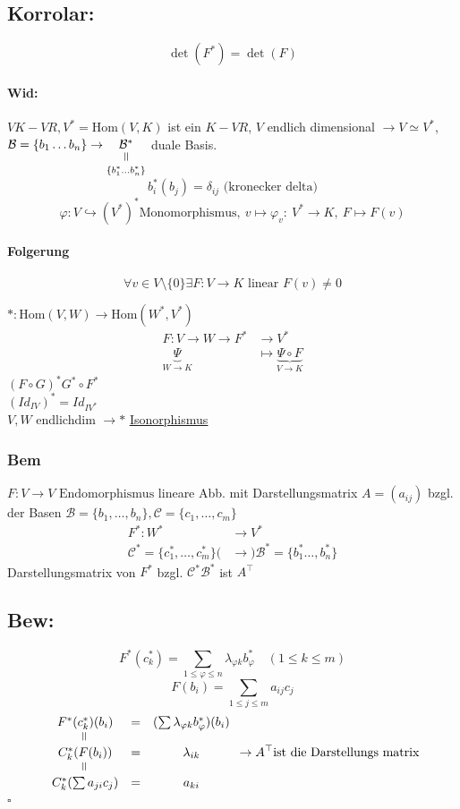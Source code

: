 \documentclass[titlepage,12pt,a4paper,ngerman]{report}
\newenvironment{bew}[1]{\subsection{Bew: #1}}{\hfill$\square$}
\newcommand{\Bew}[2]{\begin{bew}{#1}#2\end{bew}}
\newcommand{\verteq}{\rotatebox{90}{$\,=$}}
\newcommand{\equalto}[2]{\underset{\scriptstyle\overset{\mkern4mu\verteq}{#2}}{#1}}
\newcommand{\tx}[1]{\textrm{#1}}
\newcommand{\ub}[1]{\underbrace{#1}}
\newcommand{\enph}{F: V \to V \textrm{ Endomorphismus}}
\begin{document}
\subsection{Korrolar:}
$$ \det(F^*) = \det(F) $$


\paragraph{Wid:}
$V K-VR, V^* = \tx{Hom} (V,K)$ ist ein $K-VR$, $V$ endlich dimensional $\rightarrow V \simeq V^*$, $\mathcal B = \{b_1 \dots b_n\} \rightarrow \equalto{\mathcal{B}^*}{\{b_1^* \dots b_n^*\}}$ duale Basis.
$$b_i^* (b_j) = \delta_{ij} \tx{ (kronecker delta)}$$
$$\varphi: V \hookrightarrow (V^*)^* \tx{Monomorphismus},\ v \mapsto \varphi_v:\ V^* \to K,\ F \mapsto F(v)$$ 
\paragraph{Folgerung}
$$\forall v \in V \setminus \{0\} \exists F: V \to K \tx{ linear } F(v) \neq 0$$

$ * : \tx{Hom}(V,W) \to \tx{Hom}(W^*,V^*) $\\
\begin{align*}
F: V \to W \rightarrow F^* &\to V^* \\
\ub{\Psi}_{W \to K} &\mapsto \ub{ \Psi \circ F}_{ V \to K} 
\end{align*}
$ (F\circ G)^* G^* \circ F^* $\\
$ (Id_{IV})^* = Id_{IV^*} $\\
$ V,W $ endlichdim $ \rightarrow * $ \underline{\underline{Isonorphismus}} 

\subsubsection*{Bem}
$ \enph $ lineare Abb. mit Darstellungsmatrix $ A = (a_{ij}) $ bzgl. der Basen $ \mathcal{B} = \{b_1,\dots ,b_n\} , \mathcal{C}= \{c_1,\dots,c_m\} $\\

\begin{align*}
F^*: W^* &\to V^* \\
\mathcal{C}^* = \{ c^*_1,\dots , c^*_m\} (&\rightarrow) \mathcal{B}^* = \{b^*_1  \dots , b^*_n\} 
\end{align*} 
Darstellungsmatrix von $ F^* $ bzgl. $ \mathcal{C}^* \mathcal{B}^* $ ist $ A^\top $

\Bew{}{
	$$F^* (c_k^*) = \sum _{1\leq \varphi \leq n} \lambda_{\varphi k}b_\varphi^* \quad (1\leq k \leq m)$$
	$$F(b_i) = \sum _{1\leq j \leq m} a_{ij} c_j$$
	$$ \begin{array}{ccc}
	F^* (c_k^*) (b_i) & = &(\sum \lambda_{\varphi k} b_\varphi^*) (b_i)\\
	\rotatebox{90}{=} & &  \\
	C_k^* (F(b_i)) & = & \lambda_{ik}\\
	\rotatebox{90}{=} & & \\
	C_k^*(\sum a_{ji}c_j) & = & a_{ki}
	\end{array} \rightarrow A^\top \tx{ist die Darstellungs matrix}$$
}
\end{document}
